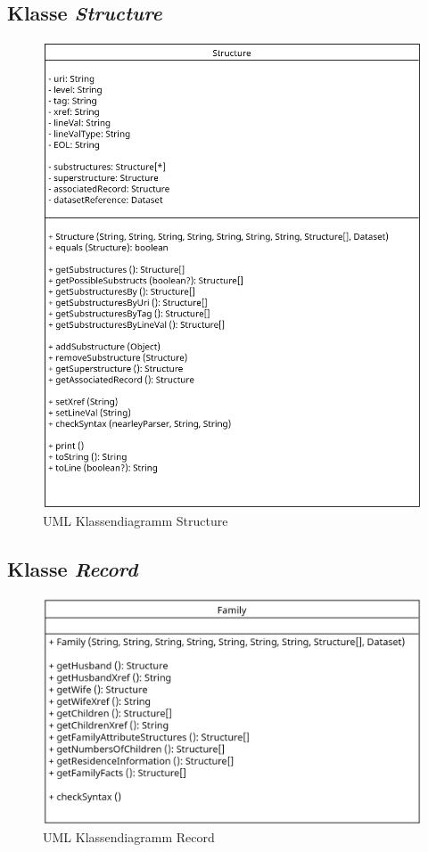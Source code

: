 \subsection{Klasse \textit{Structure}}
\label{subsec: Implementierung - Gedcom Struktur - Klasse Structure}
\begin{figure}[h]
	\centering
	\includegraphics[width=1\textwidth]{images/UML_Class_Structure.png}
	\caption{UML Klassendiagramm Structure}
	\label{fig: UML Klassendiagramm Structure}
\end{figure}

\subsection{Klasse \textit{Record}}
\label{subsec: Implementierung - Gedcom Struktur - Klasse Record}
\begin{figure}[h]
	\centering
	\includegraphics[width=1\textwidth]{images/UML_Class_Record.png}
	\caption{UML Klassendiagramm Record}
	\label{fig: UML Klassendiagramm Record}
\end{figure}

